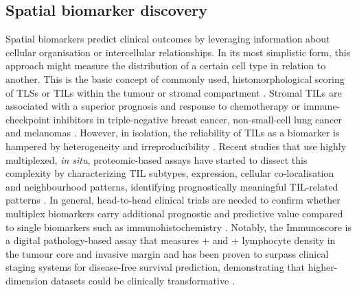 \subsection*{Spatial biomarker discovery}

Spatial biomarkers predict clinical outcomes by leveraging information about cellular organisation or intercellular relationships. In its most simplistic form, this approach might measure the distribution of a certain cell type in relation to another. This is the basic concept of commonly used, histomorphological scoring of \acp{TLS} or \acp{TIL} within the tumour or stromal compartment . Stromal \acp{TIL} are associated with a superior prognosis and response to chemotherapy or immune-checkpoint inhibitors in triple-negative breast cancer, non-small-cell lung cancer and melanomas \parencite{Azimi2012-aa,Lee2016-hg,Helmink2020-gz,Chen2020-ua,Salgado2015-ne}. However, in isolation, the reliability of \acp{TIL} as a biomarker is hampered by heterogeneity and irreproducibility \parencite{Salgado2015-ne}. Recent studies that use highly multiplexed, \textit{in situ}, proteomic-based assays have started to dissect this complexity by characterizing \ac{TIL} subtypes, expression, cellular co-localisation and neighbourhood patterns, identifying prognostically meaningful \ac{TIL}-related patterns \parencite{Moldoveanu2022-qu,Keren2018-or}. In general, head-to-head clinical trials are needed to confirm whether multiplex biomarkers carry additional prognostic and predictive value compared to single biomarkers such as  immunohistochemistry \parencite{Lu2019-lo}. Notably, the Immunoscore \parencite{Galon2006-ow} is a digital pathology-based assay that measures + and + lymphocyte density in the tumour core and invasive margin and has been proven to surpass clinical staging systems for disease-free survival prediction, demonstrating that higher-dimension datasets could be clinically transformative \parencite{Pages2018-ka}.

